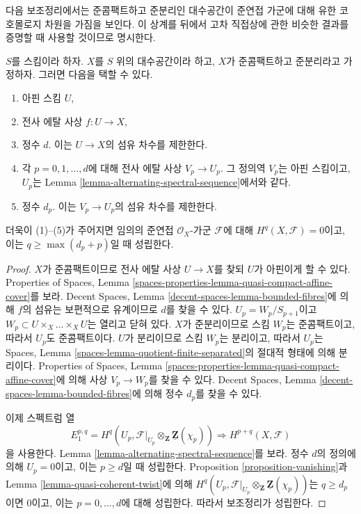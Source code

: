 \noindent
다음 보조정리에서는 준콤팩트하고 준분리인 대수공간이 준연접
가군에 대해 유한 코호몰로지 차원을 가짐을 보인다. 이 상계를 뒤에서
고차 직접상에 관한 비슷한 결과를 증명할 때 사용할 것이므로 명시한다.

\begin{lemma}
\label{lemma-vanishing-quasi-separated}
$S$를 스킴이라 하자. $X$를 $S$ 위의 대수공간이라 하고,
$X$가 준콤팩트하고 준분리라고 가정하자. 그러면 다음을 택할 수 있다.
\begin{enumerate}
\item 아핀 스킴 $U$,
\item 전사 에탈 사상 $f : U \to X$,
\item 정수 $d$. 이는 $U \to X$의 섬유 차수를 제한한다.
\item 각 $p = 0, 1, \ldots, d$에 대해 전사 에탈 사상
$V_p \to U_p$. 그 정의역 $V_p$는 아핀 스킴이고, $U_p$는 Lemma
\ref{lemma-alternating-spectral-sequence}에서와 같다.
\item 정수 $d_p$. 이는 $V_p \to U_p$의 섬유 차수를 제한한다.
\end{enumerate}
더욱이 (1)--(5)가 주어지면 임의의 준연접 $\mathcal{O}_X$-가군
$\mathcal{F}$에 대해 $H^q(X, \mathcal{F}) = 0$이고, 이는
$q \geq \max(d_p + p)$일 때 성립한다.
\end{lemma}

\begin{proof}
$X$가 준콤팩트이므로 전사 에탈 사상 $U \to X$를 찾되 $U$가
아핀이게 할 수 있다. Properties of Spaces, Lemma
\ref{spaces-properties-lemma-quasi-compact-affine-cover}를 보라.
Decent Spaces, Lemma \ref{decent-spaces-lemma-bounded-fibres}에 의해
$f$의 섬유는 보편적으로 유계이므로 $d$를 찾을 수 있다.
$U_p = W_p/S_{p + 1}$이고
$W_p \subset U \times_X \ldots \times_X U$는 열리고 닫혀 있다.
$X$가 준분리이므로 스킴 $W_p$는 준콤팩트이고, 따라서 $U_p$도
준콤팩트이다. $U$가 분리이므로 스킴 $W_p$는 분리이고,
따라서 $U_p$는 Spaces, Lemma
\ref{spaces-lemma-quotient-finite-separated}의 절대적 형태에 의해 분리이다.
Properties of Spaces, Lemma
\ref{spaces-properties-lemma-quasi-compact-affine-cover}에 의해
사상 $V_p \to W_p$를 찾을 수 있다. Decent Spaces, Lemma
\ref{decent-spaces-lemma-bounded-fibres}에 의해 정수 $d_p$를 찾을 수 있다.

\medskip\noindent
이제 스펙트럼 열
$$
E_1^{p, q} =
H^q(U_p, \mathcal{F}|_{U_p} \otimes_\mathbf{Z} \underline{\mathbf{Z}}(\chi_p))
\Rightarrow
H^{p + q}(X, \mathcal{F})
$$
을 사용한다. Lemma \ref{lemma-alternating-spectral-sequence}를 보라.
정수 $d$의 정의에 의해
$U_p = 0$이고, 이는 $p \geq d$일 때 성립한다. Proposition
\ref{proposition-vanishing}과 Lemma
\ref{lemma-quasi-coherent-twist}에 의해
$H^q(U_p,
\mathcal{F}|_{U_p} \otimes_\mathbf{Z} \underline{\mathbf{Z}}(\chi_p))$는
$q \geq d_p$이면 0이고, 이는 $p = 0, \ldots, d$에 대해 성립한다.
따라서 보조정리가 성립한다.
\end{proof}









